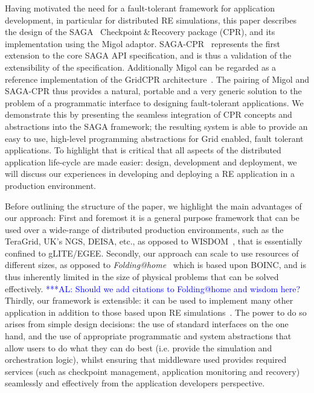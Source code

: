 \documentclass[conference,final]{IEEEtran}
\newcommand{\alnote}[1]{ {\textcolor{blue} { ***AL: #1 }}}
\newcommand{\alnote}[1]{}
\begin{document}
Having motivated the need for a fault-tolerant framework for
application development, in particular for distributed RE simulations,
this paper describes the design of the SAGA~\cite{saga_gfd90}
Checkpoint\,\&\,Recovery package (CPR), and its implementation using
the Migol adaptor. SAGA-CPR~\cite{saga-cpr} represents the first
extension to the core SAGA API specification, and is thus a validation
of the extensibility of the specification.  Additionally Migol 
can be regarded as a reference implementation of the GridCPR
architecture~\cite{ogf_cpr_arch}. %
The pairing of Migol and SAGA-CPR thus provides a natural, portable
and a very generic solution to the problem of a programmatic interface
to designing fault-tolerant applications.  We demonstrate this by
presenting the seamless integration of CPR concepts and abstractions
into the SAGA framework; the resulting system is able to provide an
easy to use, high-level programming abstractions for Grid enabled,
fault tolerant applications. To highlight that is critical that all
aspects of the distributed application life-cycle are made easier:
design, development and deployment, we will discuss our experiences in
developing and deploying a RE application in a production environment.


Before outlining the structure of the paper, we highlight the main
advantages of our approach: First and foremost it is a general purpose
framework that can be used over a wide-range of distributed production
environments, such as the TeraGrid, UK's NGS, DEISA, etc., as opposed
to WISDOM~\cite{wisdom}, that is essentially confined to
gLITE/EGEE. Secondly, our approach can scale to use resources of
different sizes, as opposed to {\it Folding@home}~\cite{folding} which
is based upon BOINC, and is thus inherently limited in the size of
physical problems that can be solved effectively.  \alnote{Should we
  add citations to Folding@home and wisdom here?}  Thirdly, our
framework is extensible: it can be used to implement many other
application in addition to those based upon RE
simulations~\cite{escience07}. The power to do so arises
from simple design decisions: the use of standard interfaces on the
one hand, and the use of appropriate programmatic and system
abstractions that allow users to do what they can do best
(i.e. provide the simulation and orchestration logic), whilst ensuring
that middleware used provides required services (such as checkpoint
management, application monitoring and recovery) seamlessly and
effectively from the application developers perspective.
\end{document}
